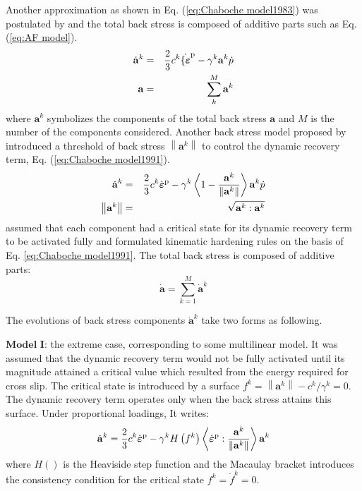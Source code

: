 \documentclass[preprint,5p,twocolumn,10pt,sort&compress]{elsarticle}
\newcommand{\bfepsilon}{{\mbox{\boldmath{$\varepsilon$}}}}
\begin{document}
Another approximation as shown in Eq. (\ref{eq:Chaboche model1983}) was postulated by \cite{Chaboche1983On} and the total back stress is composed of additive parts such as Eq. (\ref{eq:AF model}).
\begin{eqnarray}\label{eq:Chaboche model1983}
\dot{\mathbf{a}}^{k}&=&\frac{2}{3}c^{k}\dot{\{\bfepsilon}^{\rm p}-\gamma^{k} \mathbf{a}^{k}\dot{p}\\
\mathbf{a}&=&\sum_{k}^{M}\mathbf{a}^{k}
\end{eqnarray}
where $\mathbf{a}^{k}$ symbolizes the components of the total back stress $\mathbf{a}$ and $M$ is the number of the components considered. Another back stress model proposed by \cite{Chaboche1991On} introduced a threshold of back stress $\left\|\mathbf{a}^{k}\right\|$ to control the dynamic recovery term, Eq. (\ref{eq:Chaboche model1991}).
\begin{eqnarray}\label{eq:Chaboche model1991}
\dot{\mathbf{a}}^{k}&=&\frac{2}{3} c^{k} \dot{\bfepsilon}^{\mathrm{p}}-\gamma^{k}\left\langle 1-\frac{\mathbf{a}^{k}}{\left\|\mathbf{a}^{k}\right\|}\right\rangle \mathbf{a}^{k} \dot{p}\\
\left\|\mathbf{a}^{k}\right\|&=&\sqrt{\mathbf{a}^{k} : \mathbf{a}^{k}}
\end{eqnarray}
\cite{Ohno1993Kinematic} assumed that each component had a critical state for its dynamic recovery term to be activated fully and formulated kinematic hardening rules on the basis of Eq. \ref{eq:Chaboche model1991}. The total back stress is composed of additive parts:
\begin{equation}
\dot{\mathbf{a}}=\sum_{k=1}^{M} \dot{\mathbf{a}}^{k}
\end{equation}

The evolutions of back stress components $\dot{\mathbf{a}}^{k}$ take two forms as following.

$\textbf{Model I}$: the extreme case, corresponding to some multilinear model. It was assumed that the dynamic recovery term would not be fully activated until its magnitude attained a critical value which resulted from the energy required for cross slip. The critical state is introduced by a surface $f^{k}=\left\|\mathbf{a}^{k}\right\|-c^{k} / \gamma^{k}=0$. The dynamic recovery term operates only when the back stress attains this surface. Under proportional loadings, It writes:
\begin{equation}\label{eq:Ohno Wang model 1}
\dot{\mathbf{a}}^{k}=\frac{2}{3}c^{k}\dot{\bfepsilon}^{\rm p}-\gamma^{k} H\left ( f^{k} \right )\left \langle \dot{\bfepsilon}^{\rm p}: \frac{\mathbf{a}^{k}}{\left \| \mathbf{a}^{k} \right \|}\right \rangle\mathbf{a}^{k}\\
\end{equation}
where $H\left( \right)$ is the Heaviside step function and the Macaulay bracket introduces the consistency condition for the critical state $f^{k}=\dot{f}^{k}=0$.
\end{document}
